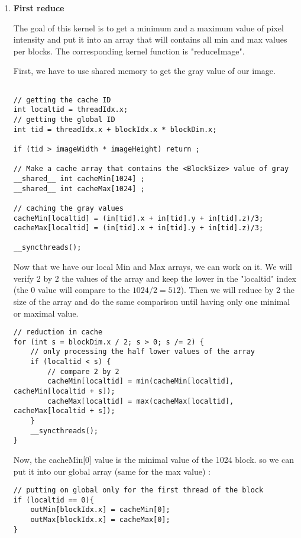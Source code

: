 \documentclass{article}
\begin{document}
    \begin{enumerate}     

    \item \textbf{First reduce}
    
    The goal of this kernel is to get a minimum and a maximum value of pixel intensity and put it into an array that will contains all min and max values per blocks. The corresponding kernel function is "reduceImage". 
    
    First, we have to use shared memory to get the gray value of our image. 
    \begin{verbatim}
    
// getting the cache ID
int localtid = threadIdx.x; 
// getting the global ID
int tid = threadIdx.x + blockIdx.x * blockDim.x;

if (tid > imageWidth * imageHeight) return ;

// Make a cache array that contains the <BlockSize> value of gray
__shared__ int cacheMin[1024] ;
__shared__ int cacheMax[1024] ;	

// caching the gray values
cacheMin[localtid] = (in[tid].x + in[tid].y + in[tid].z)/3;
cacheMax[localtid] = (in[tid].x + in[tid].y + in[tid].z)/3;

__syncthreads();
    \end{verbatim}
    
    Now that we have our local Min and Max arrays, we can work on it. We will verify 2 by 2 the values of the array and keep the lower in the "localtid" index (the 0 value will compare to the $1024/2 = 512$). Then we will reduce by 2 the size of the array and do the same comparison until having only one minimal or maximal value. 
    
    \begin{verbatim}
// reduction in cache
for (int s = blockDim.x / 2; s > 0; s /= 2) {
	// only processing the half lower values of the array
	if (localtid < s) {
		// compare 2 by 2
		cacheMin[localtid] = min(cacheMin[localtid], cacheMin[localtid + s]);
		cacheMax[localtid] = max(cacheMax[localtid], cacheMax[localtid + s]);
	}
	__syncthreads();
}
    \end{verbatim}
    
    Now, the cacheMin[0] value is the minimal value of the 1024 block. so we can put it into our global array (same for the max value) : 
    
    \begin{verbatim}
// putting on global only for the first thread of the block 
if (localtid == 0){ 
    outMin[blockIdx.x] = cacheMin[0];
    outMax[blockIdx.x] = cacheMax[0];
}
    \end{verbatim}


\end{enumerate}
\end{document}
